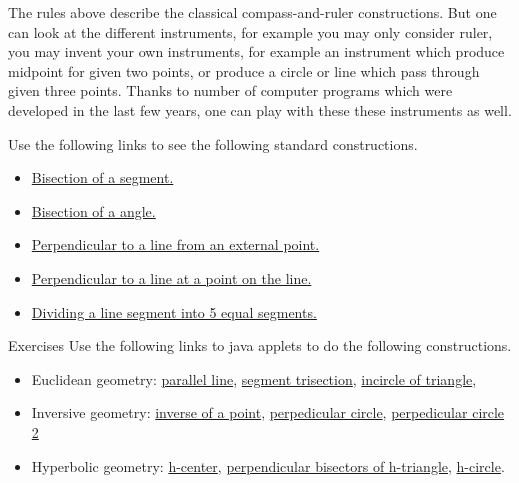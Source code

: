 {The rules above describe the classical compass-and-ruler constructions. 
But one can look at the different instruments, for example
you may only consider ruler,
you may invent your own instruments, for example an instrument which produce midpoint for given two points, or produce a circle or line which pass through given three points.
Thanks to number of computer programs which were developed in the last few years, one can play with these these instruments as well. 


Use the following links to see the following standard constructions.
\begin{itemize}
\item \href{run:./car/segment-bisector.html}{Bisection of a segment.}
\item \href{run:./car/angle-bisector.html}{Bisection of a angle.}
\item \href{run:./car/perpendicular-1.html}{Perpendicular to a line from an external point.}
\item \href{run:./car/perpendicular-2.html}{Perpendicular to a line at a point on the line.}
\item \href{run:./car/5-sect.html}{Dividing a line segment into 5 equal segments.}
\end{itemize}

\begin{thm}{Exercises}
Use the following links to java applets to do the following constructions. 
\begin{itemize}
\item Euclidean geometry: 
\href{run:./car/parallel.html}{parallel line}, 
\href{run:./car/trisection.html}{segment trisection}, 
\href{run:./car/incircle.html}{incircle of triangle},
\item Inversive geometry: 
\href{run:./car/inverse.html}{inverse of a point}, 
\href{run:./car/h-line.html}{perpedicular circle}, 
\href{run:./car/perpendicular-circles.html}{perpedicular circle 2}
\item Hyperbolic geometry: 
\href{run:./car/h-center.html}{h-center}, 
\href{run:./car/h-triangle.html}{perpendicular bisectors of h-triangle}, 
\href{run:./h-equal.html}{h-circle}.
\end{itemize}
\end{thm}
















}
